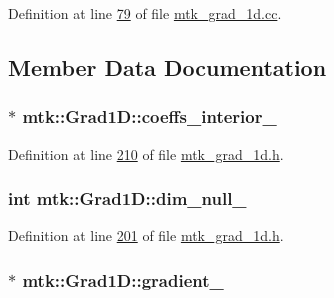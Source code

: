 Definition at line \hyperlink{mtk__grad__1d_8cc_source_l00079}{79} of file \hyperlink{mtk__grad__1d_8cc_source}{mtk\-\_\-grad\-\_\-1d.\-cc}.



\subsection{Member Data Documentation}
\hypertarget{classmtk_1_1Grad1D_a2395861161c26f237e892aacebcc1909}{
\subsubsection[{coeffs\-\_\-interior\-\_\-}]{$\ast$ mtk\-::\-Grad1\-D\-::coeffs\-\_\-interior\-\_\-\hspace{0.3cm}{\ttfamily [private]}}}\label{classmtk_1_1Grad1D_a2395861161c26f237e892aacebcc1909}


Definition at line \hyperlink{mtk__grad__1d_8h_source_l00210}{210} of file \hyperlink{mtk__grad__1d_8h_source}{mtk\-\_\-grad\-\_\-1d.\-h}.

\hypertarget{classmtk_1_1Grad1D_abe8eaf4f5c451f82c062daaef31e9e6a}{
\subsubsection[{dim\-\_\-null\-\_\-}]{\setlength{\rightskip}{0pt plus 5cm}int mtk\-::\-Grad1\-D\-::dim\-\_\-null\-\_\-\hspace{0.3cm}{\ttfamily [private]}}}\label{classmtk_1_1Grad1D_abe8eaf4f5c451f82c062daaef31e9e6a}


Definition at line \hyperlink{mtk__grad__1d_8h_source_l00201}{201} of file \hyperlink{mtk__grad__1d_8h_source}{mtk\-\_\-grad\-\_\-1d.\-h}.

\hypertarget{classmtk_1_1Grad1D_a024b84b1ea285c0c590eb42d40ff4469}{
\subsubsection[{gradient\-\_\-}]{$\ast$ mtk\-::\-Grad1\-D\-::gradient\-\_\-\hspace{0.3cm}{\ttfamily [private]}}}\label{classmtk_1_1Grad1D_a024b84b1ea285c0c590eb42d40ff4469}


